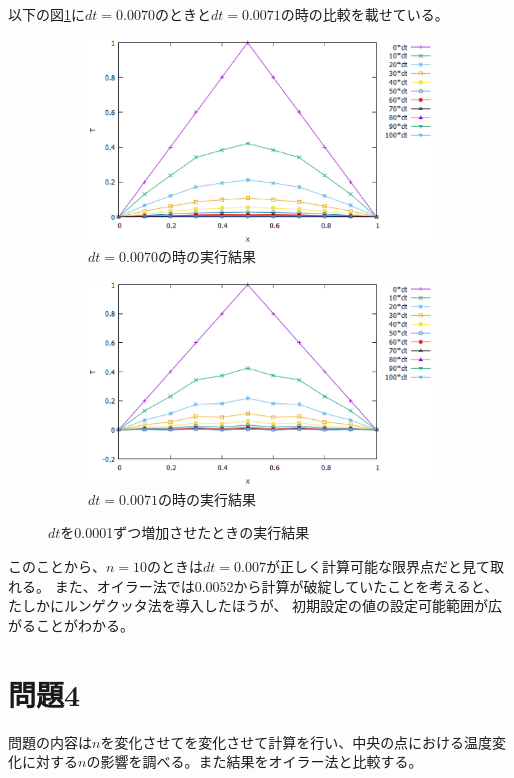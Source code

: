 \documentclass{jsarticle}
\begin{document}
以下の図\ref{fig03}に$dt=0.0070$のときと$dt=0.0071$の時の比較を載せている。
\begin{figure}[H]
	\centering
	\begin{subfigure}{0.9\columnwidth}
		\centering
		\includegraphics[width=\columnwidth]{pic04.eps}
		\caption{$dt=0.0070$の時の実行結果}
	\end{subfigure}
	\begin{subfigure}{0.9\columnwidth}
		\centering
		\includegraphics[width=\columnwidth]{pic05.eps}
		\caption{$dt=0.0071$の時の実行結果}
	\end{subfigure}
	\label{fig03}
	\caption{$dt$を0.0001ずつ増加させたときの実行結果}
\end{figure}
このことから、$n=10$のときは$dt=0.007$が正しく計算可能な限界点だと見て取れる。
また、オイラー法では0.0052から計算が破綻していたことを考えると、たしかにルンゲクッタ法を導入したほうが、
初期設定の値の設定可能範囲が広がることがわかる。

\section{問題4}
問題の内容は$n$を変化させてを変化させて計算を行い、中央の点における温度変化に対する$n$の影響を調べる。また結果をオイラー法と比較する。
\end{document}
